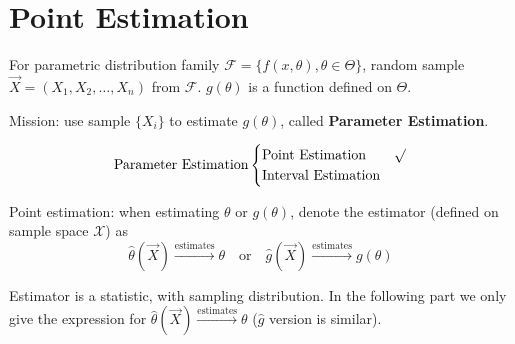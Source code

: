 \section{Point Estimation}\label{SectionPointEstimation}
    For parametric distribution family $\mathscr{F}=\{f(x,\theta),\theta\in\Theta\}$, random sample $\vec{X}=(X_1,X_2,\ldots,X_n)$ from $\mathscr{F}$. $g(\theta)$ is a function defined on $\Theta$. 

    Mission: use sample $\{X_i\}$ to estimate $g(\theta)$, called \textbf{Parameter Estimation}.

    \begin{equation}
        \text{Parameter Estimation}\begin{cases}
            \text{Point Estimation}& \surd\\
            \text{Interval Estimation}&
        \end{cases}    
    \end{equation}

    Point estimation: when estimating $\theta$ or $g(\theta)$, denote the estimator (defined on sample space $\mathscr{X}$) as
    \begin{equation}
        \hat{\theta}(\vec{X})\xrightarrow[]{\text{estimates}} \theta \quad \text{or}\quad \hat{g}(\vec{X})    \xrightarrow[]{\text{estimates}} g(\theta )
    \end{equation}

    Estimator is a statistic, with sampling distribution. In the following part we only give the expression for $ \hat{\theta }(\vec{X})\xrightarrow[]{\text{estimates}} \theta  $ ($ \hat{g} $ version is similar).
